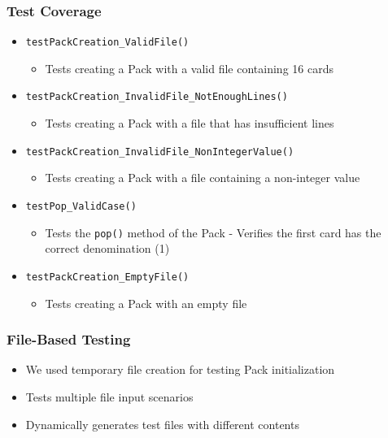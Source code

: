\documentclass{article}
\begin{document}
    \subsubsection{Test Coverage}
    \begin{itemize}
        \item \texttt{testPackCreation\_ValidFile()}
        \begin{itemize}
            \item Tests creating a Pack with a valid file containing 16 cards
        \end{itemize}
        \item \texttt{testPackCreation\_InvalidFile\_NotEnoughLines()}
        \begin{itemize}
            \item Tests creating a Pack with a file that has insufficient lines
        \end{itemize}
        \item \texttt{testPackCreation\_InvalidFile\_NonIntegerValue()}
        \begin{itemize}
            \item Tests creating a Pack with a file containing a non-integer value
        \end{itemize}
        \item \texttt{testPop\_ValidCase()}
        \begin{itemize}
            \item Tests the \texttt{pop()} method of the Pack - Verifies the first card has the correct denomination (1)
        \end{itemize}
        \item \texttt{testPackCreation\_EmptyFile()}
        \begin{itemize}
            \item Tests creating a Pack with an empty file
        \end{itemize}
    \end{itemize}

    \subsubsection{File-Based Testing}
    \begin{itemize}
        \item We used temporary file creation for testing Pack initialization
        \item Tests multiple file input scenarios
        \item Dynamically generates test files with different contents
    \end{itemize}
\end{document}
